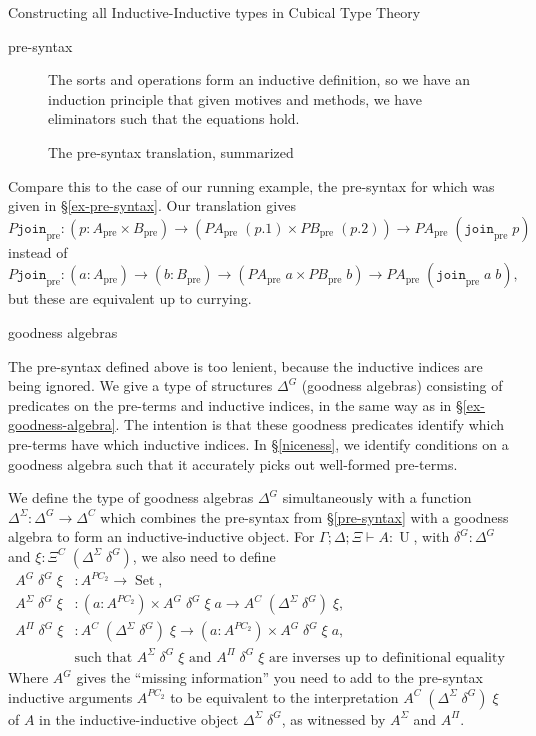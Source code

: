 \documentclass[runningheads]{llncs}
\DeclareMathOperator{\USet}{Set}
\DeclareMathOperator{\UU}{U}
\newcommand{\pre}[1]{{#1}_\text{pre}}
\newcommand{\tac}{\vdash}
\newcommand{\join}{\texttt{join}}
\begin{document}
{\begin{section}{Constructing all Inductive-Inductive types in Cubical Type Theory}
\begin{subsection}{pre-syntax}
\begin{figure}[htpb]
\begin{flushleft}
    The sorts and operations form an inductive definition, so we have an induction principle that given motives and methods, we have eliminators such that the equations hold.
    \end{flushleft}
    
    \caption{\label{pre-syntax-translation}The pre-syntax translation, summarized}
\end{figure}

Compare this to the case of our running example, the pre-syntax for which was given in \S\ref{ex-pre-syntax}. Our translation gives \[\pre{P\join} : (p : \pre{A} \times \pre{B}) \to (\pre{PA}\;(p.1)\times \pre{PB}\;(p.2)) \to \pre{PA}\;(\pre{\join}\;p)\] instead of \[\pre{P\join} : (a : \pre{A}) \to (b : \pre{B}) \to (\pre{PA}\;a \times \pre{PB}\;b) \to \pre{PA}\;(\pre{\join}\;a\;b),\] but these are equivalent up to currying.

\end{subsection}
\begin{subsection}{goodness algebras}\label{goodness-algebra}

The pre-syntax defined above is too lenient, because the inductive indices are being ignored. We give a type of structures $\Delta^G$ (goodness algebras) consisting of predicates on the pre-terms and inductive indices, in the same way as in \S\ref{ex-goodness-algebra}. The intention is that these goodness predicates identify which pre-terms have which inductive indices. In \S\ref{niceness}, we identify conditions on a goodness algebra such that it accurately picks out well-formed pre-terms.

\begin{definition}
We define the type of goodness algebras $\Delta^G$ simultaneously with a function $\Delta^{\Sigma} : \Delta^G \to \Delta^C$ which combines the pre-syntax from \S\ref{pre-syntax} with a goodness algebra to form an inductive-inductive object. For $\Gamma ; \Delta ; \Xi \tac A : \UU$, with $\delta^G : \Delta^G$ and $\xi : \Xi^C\;(\Delta^\Sigma\;\delta^G)$, we also need to define
\begin{align*}
A^G\;\delta^G\;\xi &: A^{PC_2} \to \USet,\\
A^\Sigma\;\delta^G\;\xi &: (a : A^{PC_2}) \times A^G\;\delta^G\;\xi\;a \to A^C\;(\Delta^\Sigma\;\delta^G)\;\xi,\\
A^{\Pi}\;\delta^G\;\xi &:A^C\;(\Delta^\Sigma\;\delta^G)\;\xi \to (a : A^{PC_2}) \times A^G\;\delta^G\;\xi\;a,\\
&\text{such that $A^\Sigma\;\delta^G\;\xi$ and $A^{\Pi}\;\delta^G\;\xi$ are inverses up to definitional equality}
\end{align*}
Where $A^G$ gives the ``missing information'' you need to add to the pre-syntax inductive arguments $A^{PC_2}$ to be equivalent to the interpretation $A^C\;(\Delta^\Sigma\;\delta^G)\;\xi$ of $A$ in the inductive-inductive object $\Delta^\Sigma\;\delta^G$, as witnessed by $A^\Sigma$ and $A^\Pi$.


\end{definition}
\end{subsection}
\end{section}}
\end{document}
